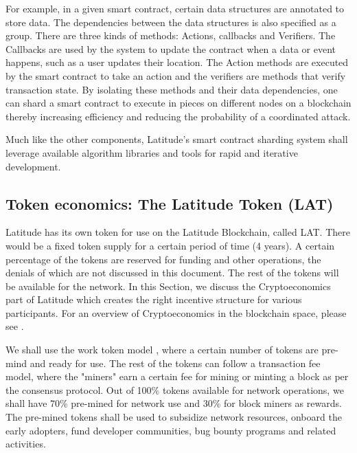 For example, in a given smart contract, certain data structures are annotated to store data. The dependencies between
the data structures is also specified as a group. There are three kinds of methods: Actions, callbacks and Verifiers. 
The Callbacks are used by the system to update the contract when a data or event happens, such as a user updates their
location. The Action methods are executed by the smart contract to take an action and the verifiers are methods that
verify transaction state. By isolating these methods and their data dependencies, one can shard a smart contract to
execute in pieces on different nodes on a blockchain thereby increasing efficiency and reducing the probability of a
coordinated attack.

Much like the other components, Latitude's smart contract sharding system shall leverage available algorithm libraries
and tools for rapid and iterative development.

\subsection{Token economics: The Latitude Token (LAT)}

Latitude has its own token for use on the Latitude Blockchain, called LAT. There would be a fixed token supply for a
certain period of time (4 years). A certain percentage of the tokens are reserved for funding and other operations, the
denials of which are not discussed in this document. The rest of the tokens will be available for the network. In this
Section, we discuss the Cryptoeconomics part of Latitude which creates the right incentive structure for various
participants.  For an overview of Cryptoeconomics in the blockchain space, please see \cite{sinclair_crypto}.

We shall use the work token model \cite{work_token}, where a certain number of tokens are pre-mind and ready for use.
The rest of the tokens can follow a transaction fee model, where the "miners" earn a certain fee for mining or minting
a block as per the consensus protocol. Out of 100\% tokens available for network operations, we shall have 70\%
pre-mined for network use and 30\% for block miners as rewards. The pre-mined tokens shall be used to subsidize network
resources, onboard the early adopters, fund developer communities, bug bounty programs and related activities.

